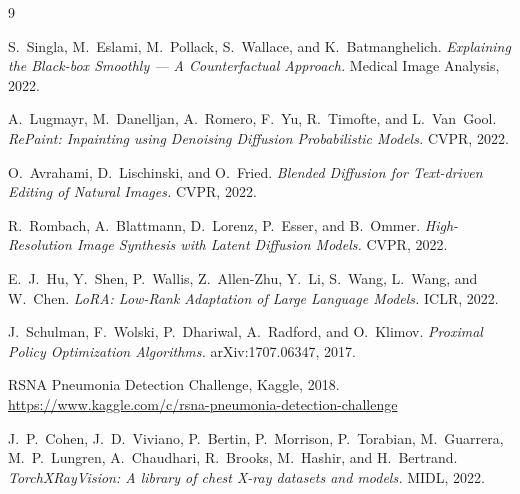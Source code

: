 \documentclass[10pt,twocolumn]{article}
\begin{document}
{\small

\begin{thebibliography}{9}

S.~Singla, M.~Eslami, M.~Pollack, S.~Wallace, and K.~Batmanghelich.
\textit{Explaining the Black-box Smoothly — A Counterfactual Approach.}
Medical Image Analysis, 2022.

A.~Lugmayr, M.~Danelljan, A.~Romero, F.~Yu, R.~Timofte, and L.~Van~Gool.
\textit{RePaint: Inpainting using Denoising Diffusion Probabilistic Models.}
CVPR, 2022.

O.~Avrahami, D.~Lischinski, and O.~Fried.
\textit{Blended Diffusion for Text-driven Editing of Natural Images.}
CVPR, 2022.

R.~Rombach, A.~Blattmann, D.~Lorenz, P.~Esser, and B.~Ommer.
\textit{High-Resolution Image Synthesis with Latent Diffusion Models.}
CVPR, 2022.

E.~J.~Hu, Y.~Shen, P.~Wallis, Z.~Allen-Zhu, Y.~Li, S.~Wang, L.~Wang, and W.~Chen.
\textit{LoRA: Low-Rank Adaptation of Large Language Models.}
ICLR, 2022.

J.~Schulman, F.~Wolski, P.~Dhariwal, A.~Radford, and O.~Klimov.
\textit{Proximal Policy Optimization Algorithms.}
arXiv:1707.06347, 2017.

RSNA Pneumonia Detection Challenge, Kaggle, 2018.
\url{https://www.kaggle.com/c/rsna-pneumonia-detection-challenge}

J.~P.~Cohen, J.~D.~Viviano, P.~Bertin, P.~Morrison, P.~Torabian, M.~Guarrera,
M.~P.~Lungren, A.~Chaudhari, R.~Brooks, M.~Hashir, and H.~Bertrand.
\textit{TorchXRayVision: A library of chest X-ray datasets and models.}
MIDL, 2022.

\end{thebibliography}
}
\end{document}
